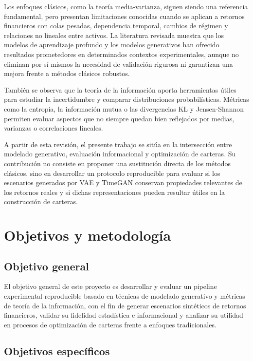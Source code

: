\documentclass[11pt,a4paper,spanish,oneside]{book}
\numberwithin{equation}{chapter}
\numberwithin{figure}{chapter}
\begin{document}
Los enfoques clásicos, como la teoría media-varianza, siguen siendo una referencia fundamental, pero presentan limitaciones conocidas cuando se aplican a retornos financieros con colas pesadas, dependencia temporal, cambios de régimen y relaciones no lineales entre activos. La literatura revisada muestra que los modelos de aprendizaje profundo y los modelos generativos han ofrecido resultados prometedores en determinados contextos experimentales, aunque no eliminan por sí mismos la necesidad de validación rigurosa ni garantizan una mejora frente a métodos clásicos robustos.

También se observa que la teoría de la información aporta herramientas útiles para estudiar la incertidumbre y comparar distribuciones probabilísticas. Métricas como la entropía, la información mutua o las divergencias KL y Jensen-Shannon permiten evaluar aspectos que no siempre quedan bien reflejados por medias, varianzas o correlaciones lineales.

A partir de esta revisión, el presente trabajo se sitúa en la intersección entre modelado generativo, evaluación informacional y optimización de carteras. Su contribución no consiste en proponer una sustitución directa de los métodos clásicos, sino en desarrollar un protocolo reproducible para evaluar si los escenarios generados por VAE y TimeGAN conservan propiedades relevantes de los retornos reales y si dichas representaciones pueden resultar útiles en la construcción de carteras.

\chapter{Objetivos y metodología}
\section{Objetivo general}

El objetivo general de este proyecto es desarrollar y evaluar un pipeline experimental reproducible basado en técnicas de modelado generativo y métricas de teoría de la información, con el fin de generar escenarios sintéticos de retornos financieros, validar su fidelidad estadística e informacional y analizar su utilidad en procesos de optimización de carteras frente a enfoques tradicionales.

\section{Objetivos específicos}
\end{document}
